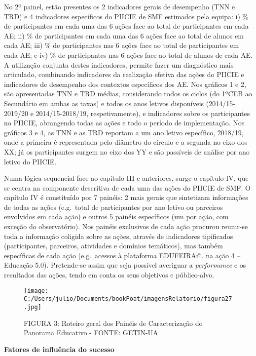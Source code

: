 \documentclass[
]{book}
\begin{document}
No 2º painel, estão presentes os 2 indicadores gerais de desempenho (TNN e TRD) e 4 indicadores específicos do PIICIE de SMF estimados pela equipa: i) \% de participantes em cada uma das 6 ações face ao total de participantes em cada AE; ii) \% de participantes em cada uma das 6 ações face ao total de alunos em cada AE; iii) \% de participantes nas 6 ações face ao total de participantes em cada AE; e iv) \% de participantes nas 6 ações face ao total de alunos de cada AE. A utilização conjunta destes indicadores, permite fazer um diagnóstico mais articulado, combinando indicadores da realização efetiva das ações do PIICIE e indicadores de desempenho dos contextos específicos dos AE. Nos gráficos 1 e 2, são apresentadas TNN e TRD médias, considerando todos os ciclos (do 1ºCEB ao Secundário em ambas as taxas) e todos os anos letivos disponíveis (2014/15-2019/20 e 2014/15-2018/19, respetivamente), e indicadores sobre os participantes no PIICIE, abrangendo todas as ações e todo o período de implementação. Nos gráficos 3 e 4, as TNN e as TRD reportam a um ano letivo específico, 2018/19, onde a primeira é representada pelo diâmetro do círculo e a segunda no eixo dos XX; já os participantes surgem no eixo dos YY e são passíveis de análise por ano letivo do PIICIE.

Numa lógica sequencial face ao capítulo III e anteriores, surge o capítulo IV, que se centra na componente descritiva de cada uma das ações do PIICIE de SMF. O capítulo IV é constituído por 7 painéis: 2 mais gerais que sintetizam informações de todas as ações (e.g.~total de participantes por ano letivo ou parceiros envolvidos em cada ação) e outros 5 painéis específicos (um por ação, com exceção do observatório). Nos painéis exclusivos de cada ação procurou reunir-se toda a informação coligida sobre as ações, através de indicadores tipificados (participantes, parceiros, atividades e domínios temáticos), mas também específicas de cada ação (e.g.~acessos à plataforma EDUFEIRA@. na ação 4 -- Educação 5.0). Pretende-se assim que seja possível averiguar a \emph{performance} e os resultados das ações, tendo em conta os seus objetivos e público-alvo.

\begin{figure}
\centering
\texttt{[image: C:/Users/julio/Documents/bookPoat/imagensRelatorio/figura27.jpg]}
\caption{FIGURA 3: Roteiro geral dos Painéis de Caracterização do Panorama Educativo - FONTE: GETIN-UA}
\end{figure}

\textbf{Fatores de influência do sucesso}
\end{document}
